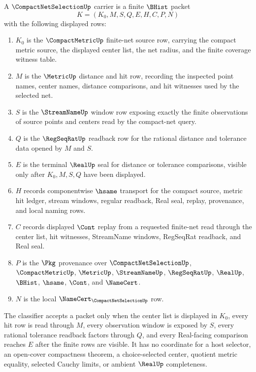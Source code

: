 \begin{definition}
\label{def:compact-net-selection-carrier}
A $\CompactNetSelectionUp$ carrier is a finite $\BHist$ packet
$$
K=(K_0,M,S,Q,E,H,C,P,N)
$$
with the following displayed rows:
\begin{enumerate}
\item $K_0$ is the $\CompactMetricUp$ finite-net source row, carrying the compact metric source, the displayed center list, the net radius, and the finite coverage witness table.
\item $M$ is the $\MetricUp$ distance and hit row, recording the inspected point names, center names, distance comparisons, and hit witnesses used by the selected net.
\item $S$ is the $\StreamNameUp$ window row exposing exactly the finite observations of source points and centers read by the compact-net query.
\item $Q$ is the $\RegSeqRatUp$ readback row for the rational distance and tolerance data opened by $M$ and $S$.
\item $E$ is the terminal $\RealUp$ seal for distance or tolerance comparisons, visible only after $K_0,M,S,Q$ have been displayed.
\item $H$ records componentwise $\hsame$ transport for the compact source, metric hit ledger, stream windows, regular readback, Real seal, replay, provenance, and local naming rows.
\item $C$ records displayed $\Cont$ replay from a requested finite-net read through the center list, hit witnesses, StreamName windows, RegSeqRat readback, and Real seal.
\item $P$ is the $\Pkg$ provenance over $\CompactNetSelectionUp$, $\CompactMetricUp$, $\MetricUp$, $\StreamNameUp$, $\RegSeqRatUp$, $\RealUp$, $\BHist$, $\hsame$, $\Cont$, and $\NameCert$.
\item $N$ is the local $\NameCert_{\CompactNetSelectionUp}$ row.
\end{enumerate}
The classifier accepts a packet only when the center list is displayed in $K_0$, every hit row is read through $M$, every observation window is exposed by $S$, every rational tolerance readback factors through $Q$, and every Real-facing comparison reaches $E$ after the finite rows are visible. It has no coordinate for a host selector, an open-cover compactness theorem, a choice-selected center, quotient metric equality, selected Cauchy limits, or ambient $\RealUp$ completeness.
\end{definition}

